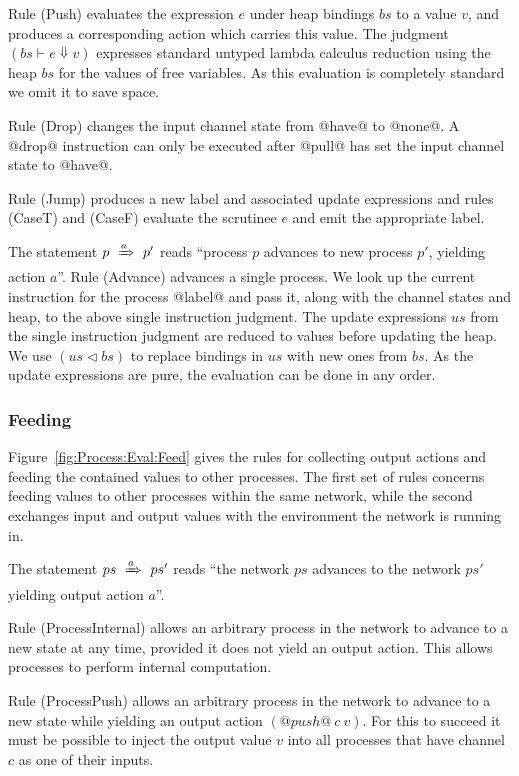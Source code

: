 Rule (Push) evaluates the expression $e$ under heap bindings $bs$ to a value $v$, and produces a corresponding action which carries this value. The judgment $(bs \vdash e \Downarrow v)$ expresses standard untyped lambda calculus reduction using the heap $bs$ for the values of free variables. As this evaluation is completely standard we omit it to save space.

Rule (Drop) changes the input channel state from @have@ to @none@. A @drop@ instruction can only be executed after @pull@ has set the input channel state to @have@. 

Rule (Jump) produces a new label and associated update expressions and rules (CaseT) and (CaseF) evaluate the scrutinee $e$ and emit the appropriate label.

The statement $p~\xRightarrow{a}~p'$ reads ``process $p$ advances to new process $p'$, yielding action $a$''. Rule (Advance) advances a single process. We look up the current instruction for the process @label@ and pass it, along with the channel states and heap, to the above single instruction judgment. The update expressions $us$ from the single instruction judgment are reduced to values before updating the heap. We use $(us \lhd bs)$ to replace bindings in $us$ with new ones from $bs$. As the update expressions are pure, the evaluation can be done in any order.


\subsubsection{Feeding}
Figure~\ref{fig:Process:Eval:Feed} gives the rules for collecting output actions and feeding the contained values to other processes. The first set of rules concerns feeding values to other processes within the same network, while the second exchanges input and output values with the environment the network is running in.

The statement $ps~\xRightarrow{a}~ps'$ reads ``the network $ps$ advances to the network $ps'$ yielding output action $a$''.

Rule (ProcessInternal) allows an arbitrary process in the network to advance to a new state at any time, provided it does not yield an output action. This allows processes to perform internal computation.

Rule (ProcessPush) allows an arbitrary process in the network to advance to a new state while yielding an output action $(@push@~c~v)$. For this to succeed it must be possible to inject the output value $v$ into all processes that have channel $c$ as one of their inputs.

